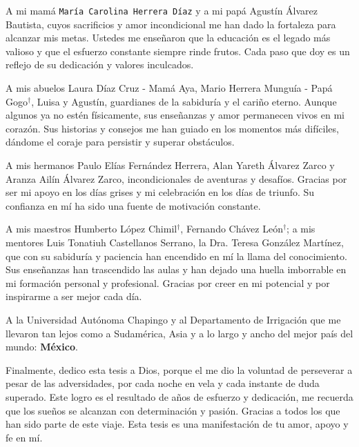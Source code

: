 A mi mamá \texttt{María Carolina Herrera Díaz} y a mi papá Agustín Álvarez Bautista, cuyos sacrificios y amor incondicional me han dado la fortaleza para alcanzar mis metas. Ustedes me enseñaron que la educación es el legado más valioso y que el esfuerzo constante siempre rinde frutos. Cada paso que doy es un reflejo de su dedicación y valores inculcados. 

A mis abuelos Laura Díaz Cruz - Mamá Aya, Mario Herrera Munguía - Papá Gogo$^\dag$, Luisa y Agustín, guardianes de la sabiduría y el cariño eterno. Aunque algunos ya no estén físicamente, sus enseñanzas y amor permanecen vivos en mi corazón. Sus historias y consejos me han guiado en los momentos más difíciles, dándome el coraje para persistir y superar obstáculos.

A mis hermanos Paulo Elías Fernández Herrera, Alan Yareth Álvarez Zarco y Aranza Ailín Álvarez Zarco, incondicionales de aventuras y desafíos. Gracias por ser mi apoyo en los días grises y mi celebración en los días de triunfo. Su confianza en mí ha sido una fuente de motivación constante.

A mis maestros Humberto López Chimil$^\dag$, Fernando Chávez León$^\dag$; a mis mentores Luis Tonatiuh Castellanos Serrano, la Dra. Teresa González Martínez, que con su sabiduría y paciencia han encendido en mí la llama del conocimiento. Sus enseñanzas han trascendido las aulas y han dejado una huella imborrable en mi formación personal y profesional. Gracias por creer en mi potencial y por inspirarme a ser mejor cada día.

A la Universidad Autónoma Chapingo y al Departamento de Irrigación que me llevaron tan lejos como a Sudamérica, Asia y a lo largo y ancho del mejor país del mundo: \textbf{México}.

Finalmente, dedico esta tesis a Dios, porque el me dio la voluntad de perseverar a pesar de las adversidades, por cada noche en vela y cada instante de duda superado. Este logro es el resultado de años de esfuerzo y dedicación, me recuerda que los sueños se alcanzan con determinación y pasión. Gracias a todos los que han sido parte de este viaje. Esta tesis es una manifestación de tu amor, apoyo y fe en mí.
